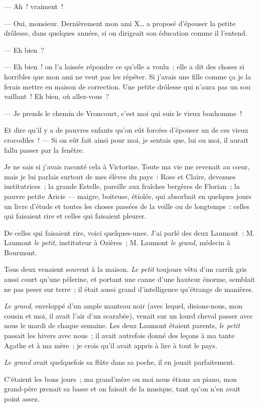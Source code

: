 \documentclass[french,twoside]{book} %
\begin{document}
— Ah ! vraiment !\par
— Oui, monsieur. Dernièrement mon ami X… a proposé d’épouser la petite drôlesse, dans quelques années, si on dirigeait son éducation comme il l’entend.\par
— Eh bien ?\par
— Eh bien ! on l’a laissée répondre ce qu’elle  a voulu ; elle a dit des choses si horribles que mon ami ne veut pas les répéter. Si j’avais une fille comme ça je la ferais mettre en maison de correction. Une petite drôlesse qui n’aura pas un sou vaillant ! Eh bien, où allez-vous ?\par
— Je prends le chemin de Vroncourt, c’est moi qui suis le vieux bonhomme !\par
Et dire qu’il y a de pauvres enfants qu’on eût forcées d’épouser un de ces vieux crocodiles ! — Si on eût fait ainsi pour moi, je sentais que, lui ou moi, il aurait fallu passer par la fenêtre.\par
Je ne sais si j’avais raconté cela à Victorine. Toute ma vie me revenait au cœur, mais je lui parlais surtout de mes élèves du pays : Rose et Claire, devenues institutrices ; la grande Estelle, pareille aux fraîches bergères de Florian ; la pauvre petite Aricie — maigre, boiteuse, étiolée, qui absorbait en quelques jours un livre d’étude et toutes les choses passées de la veille ou de longtemps : celles qui faisaient rire et celles qui faisaient pleurer.\par
De celles qui faisaient rire, voici quelques-unes. J’ai parlé des deux Laumont : M. Laumont \emph{le petit}, instituteur à Ozières ; M. Laumont \emph{le grand}, médecin à Bourmont.\par
Tous deux venaient souvent à la maison. \emph{Le petit} toujours vêtu d’un carrik gris aussi court  qu’une pèlerine, et portant une canne d’une hauteur énorme, semblait ne pas peser sur terre ; il était aussi grand d’intelligence qu’étrange de manières.\par
\emph{Le grand}, enveloppé d’un ample manteau noir (avec lequel, disions-nous, mon cousin et moi, il avait l’air d’un scarabée), venait sur un lourd cheval passer avec nous le mardi de chaque semaine. Les deux Laumont étaient parents, \emph{le petit} passait les hivers avec nous ; il avait autrefois donné des leçons à ma tante Agathe et à ma mère ; je crois qu’il avait appris à lire à tout le pays.\par
\emph{Le grand} avait quelquefois sa flûte dans sa poche, il en jouait parfaitement.\par
C’étaient les bons jours ; ma grand’mère ou moi nous étions au piano, mon grand-père prenait sa basse et on faisait de la musique, tant qu’on n’en avait point assez.\par
\end{document}
